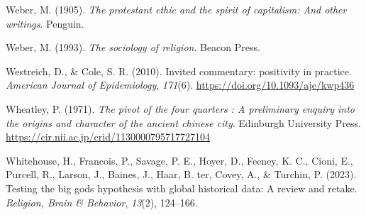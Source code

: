 \documentclass[
  single column]{article}
\newlength{\cslhangindent}
\newenvironment{CSLReferences}[2] %
 {\begin{list}{}{%
  \setlength{\itemindent}{0pt}
  \setlength{\leftmargin}{0pt}
  \setlength{\parsep}{0pt}
  \ifodd #1
   \setlength{\leftmargin}{\cslhangindent}
   \setlength{\itemindent}{-1\cslhangindent}
  \fi
  \setlength{\itemsep}{#2\baselineskip}}}
 {\end{list}}
\begin{document}
\begin{CSLReferences}{1}{0}
Weber, M. (1905). \emph{The protestant ethic and the spirit of
capitalism: And other writings}. Penguin.

Weber, M. (1993). \emph{The sociology of religion}. Beacon Press.

Westreich, D., \& Cole, S. R. (2010). Invited commentary: positivity in
practice. \emph{American Journal of Epidemiology}, \emph{171}(6).
\url{https://doi.org/10.1093/aje/kwp436}

Wheatley, P. (1971). \emph{The pivot of the four quarters : A
preliminary enquiry into the origins and character of the ancient
chinese city}. Edinburgh University Press.
\url{https://cir.nii.ac.jp/crid/1130000795717727104}

Whitehouse, H., Francois, P., Savage, P. E., Hoyer, D., Feeney, K. C.,
Cioni, E., Purcell, R., Larson, J., Baines, J., Haar, B. ter, Covey, A.,
\& Turchin, P. (2023). Testing the big gods hypothesis with global
historical data: A review and retake. \emph{Religion, Brain \&
Behavior}, \emph{13}(2), 124--166.

\end{CSLReferences}
\end{document}
